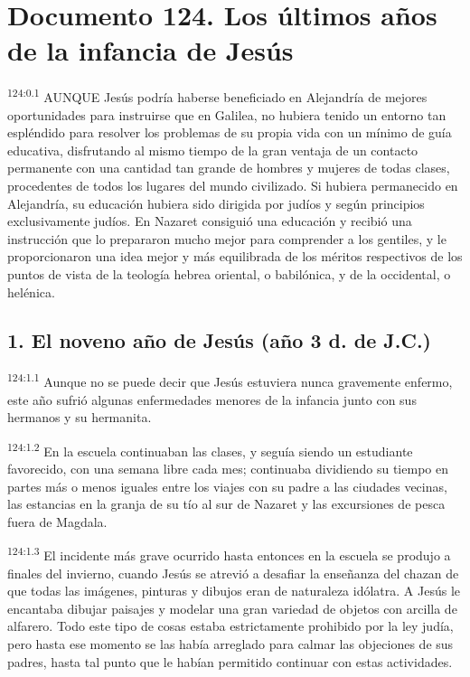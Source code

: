 \chapter{Documento 124. Los últimos años de la infancia de Jesús}
\par 
\textsuperscript{124:0.1} AUNQUE Jesús podría haberse beneficiado en Alejandría de mejores oportunidades para instruirse que en Galilea, no hubiera tenido un entorno tan espléndido para resolver los problemas de su propia vida con un mínimo de guía educativa, disfrutando al mismo tiempo de la gran ventaja de un contacto permanente con una cantidad tan grande de hombres y mujeres de todas clases, procedentes de todos los lugares del mundo civilizado. Si hubiera permanecido en Alejandría, su educación hubiera sido dirigida por judíos y según principios exclusivamente judíos. En Nazaret consiguió una educación y recibió una instrucción que lo prepararon mucho mejor para comprender a los gentiles, y le proporcionaron una idea mejor y más equilibrada de los méritos respectivos de los puntos de vista de la teología hebrea oriental, o babilónica, y de la occidental, o helénica.

\section*{1. El noveno año de Jesús (año 3 d. de J.C.)}
\par 
\textsuperscript{124:1.1} Aunque no se puede decir que Jesús estuviera nunca gravemente enfermo, este año sufrió algunas enfermedades menores de la infancia junto con sus hermanos y su hermanita.

\par 
\textsuperscript{124:1.2} En la escuela continuaban las clases, y seguía siendo un estudiante favorecido, con una semana libre cada mes; continuaba dividiendo su tiempo en partes más o menos iguales entre los viajes con su padre a las ciudades vecinas, las estancias en la granja de su tío al sur de Nazaret y las excursiones de pesca fuera de Magdala.

\par 
\textsuperscript{124:1.3} El incidente más grave ocurrido hasta entonces en la escuela se produjo a finales del invierno, cuando Jesús se atrevió a desafiar la enseñanza del chazan de que todas las imágenes, pinturas y dibujos eran de naturaleza idólatra. A Jesús le encantaba dibujar paisajes y modelar una gran variedad de objetos con arcilla de alfarero. Todo este tipo de cosas estaba estrictamente prohibido por la ley judía, pero hasta ese momento se las había arreglado para calmar las objeciones de sus padres, hasta tal punto que le habían permitido continuar con estas actividades.


